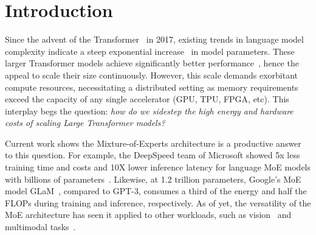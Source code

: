 \documentclass[acmsmall,screen,review,anonymous]{acmart}
\begin{document}



\maketitle

\section{Introduction}\label{sec:introduction}
Since the advent of the Transformer~\cite{NEURIPS2017_3f5ee243} in 2017, existing trends in language model complexity
indicate a steep exponential increase~\cite{DBLP:journals/corr/abs-2201-11990} in model parameters.
These larger Transformer models achieve significantly better performance~\cite{DBLP:journals/corr/abs-2005-14165},
hence the appeal to scale their size continuously.
However, this scale demands exorbitant compute resources,
necessitating a distributed setting as memory requirements exceed the capacity of any
single accelerator (GPU, TPU, FPGA, etc).
This interplay begs the question:
\emph{how do we sidestep the high energy and hardware costs of scaling Large Transformer models?}

Current work shows the Mixture-of-Experts architecture is a productive answer to this question.
For example, the DeepSpeed team of Microsoft showed 5x less training time and costs
and 10X lower inference latency for language MoE models with billions of parameters~\cite{pmlr-v162-rajbhandari22a}.
Likewise, at 1.2 trillion parameters, Google's MoE model GLaM~\cite{pmlr-v162-du22c}, compared to GPT-3,
consumes a third of the energy and half the FLOPs during training and inference, respectively.
As of yet, the versatility of the MoE architecture has seen it applied to other workloads,
such as vision~\cite{NEURIPS2021_48237d9f} and multimodal tasks~\cite{NEURIPS2022_3e67e84a}.
\end{document}

